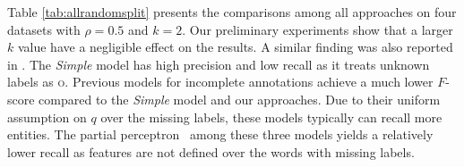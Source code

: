 Table \ref{tab:allrandomsplit} presents the comparisons among all approaches on four datasets with $\rho=0.5$ and $k=2$. 
Our preliminary experiments show that a larger $k$ value have a negligible effect on the results. 
A similar finding was also reported in \citet{nivre2008integrating}. 
The \textit{Simple} model has high precision and low recall as it treats unknown labels as \textsc{o}. 
Previous models for incomplete annotations achieve a much lower $F$-score compared to the \textit{Simple} model and our approaches.
Due to their uniform assumption on $q$ over the missing labels, these models typically can recall more entities.
The partial perceptron~\cite{carlson2009learning} among these three models yields a relatively lower recall as features are not defined over the words with missing labels. 

